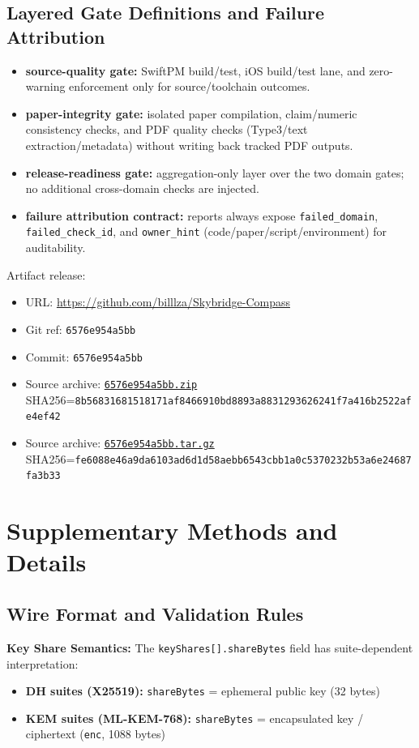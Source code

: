 \documentclass[10pt,journal,compsoc]{IEEEtran}
\newcommand{\artifacturl}{https://github.com/billlza/Skybridge-Compass}
\newcommand{\artifacttag}{6576e954a5bb}
\newcommand{\artifactsha}{6576e954a5bb}
\newcommand{\artifactshafull}{6576e954a5bb7b9c42a367ba43f086d383e5f495}
\newcommand{\artifactzipurl}{\artifacturl/archive/\artifactshafull.zip}
\newcommand{\artifactzipsha}{8b568316\allowbreak{}81518171\allowbreak{}af846691\allowbreak{}0bd8893a\allowbreak{}88312936\allowbreak{}26241f7a\allowbreak{}416b2522\allowbreak{}afe4ef42}
\newcommand{\artifacttarurl}{\artifacturl/archive/\artifactshafull.tar.gz}
\newcommand{\artifacttarsha}{fe6088e4\allowbreak{}6a9da610\allowbreak{}3ad6d1d5\allowbreak{}8aebb654\allowbreak{}3cbb1a0c\allowbreak{}5370232b\allowbreak{}53a6e246\allowbreak{}87fa3b33}
\providecommand{\tightlist}{%
	  \setlength{\itemsep}{0pt}\setlength{\parskip}{0pt}}
\begin{document}
\subsection*{Layered Gate Definitions and Failure Attribution}
\begin{itemize}\tightlist
\item \textbf{source-quality gate:} SwiftPM build/test, iOS build/test lane,
  and zero-warning enforcement only for source/toolchain outcomes.
\item \textbf{paper-integrity gate:} isolated paper compilation, claim/numeric
  consistency checks, and PDF quality checks (Type3/text extraction/metadata)
  without writing back tracked PDF outputs.
\item \textbf{release-readiness gate:} aggregation-only layer over the two
  domain gates; no additional cross-domain checks are injected.
\item \textbf{failure attribution contract:} reports always expose
  \texttt{failed\_domain}, \texttt{failed\_check\_id}, and
  \texttt{owner\_hint} (code/paper/script/environment) for auditability.
\end{itemize}

Artifact release:
\begin{itemize}\tightlist
\raggedright
\item URL: \url{\artifacturl}
\item Git ref: \texttt{\artifacttag}
\item Commit: \texttt{\artifactsha}
\item Source archive: \href{\artifactzipurl}{\texttt{\artifactsha.zip}} SHA256=\texttt{\artifactzipsha}
\item Source archive: \href{\artifacttarurl}{\texttt{\artifactsha.tar.gz}} SHA256=\texttt{\artifacttarsha}
\end{itemize}

\section*{Supplementary Methods and Details}

\subsection*{Wire Format and Validation Rules}

\textbf{Key Share Semantics:} The \texttt{keyShares{[}{]}.shareBytes}
field has suite-dependent interpretation:
\begin{itemize}\tightlist
\item
  \textbf{DH suites (X25519):} \texttt{shareBytes} = ephemeral public
  key (32 bytes)
\item
  \textbf{KEM suites (ML-KEM-768):} \texttt{shareBytes} = encapsulated
  key / ciphertext (\texttt{enc}, 1088 bytes)
\end{itemize}
\end{document}
